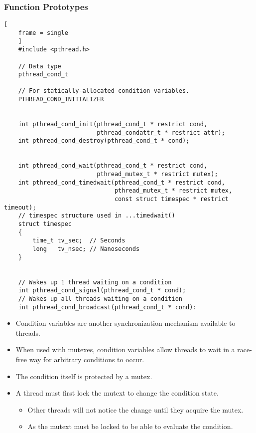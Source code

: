 \documentclass{article}
\begin{document}
\subsubsection{Function Prototypes}
\begin{lstlisting}[
    frame = single
    ]
    #include <pthread.h>

    // Data type
    pthread_cond_t

    // For statically-allocated condition variables.
    PTHREAD_COND_INITIALIZER


    int pthread_cond_init(pthread_cond_t * restrict cond,
                          pthread_condattr_t * restrict attr);
    int pthread_cond_destroy(pthread_cond_t * cond);


    int pthread_cond_wait(pthread_cond_t * restrict cond,
                          pthread_mutex_t * restrict mutex);
    int pthread_cond_timedwait(pthread_cond_t * restrict cond,
                               pthread_mutex_t * restrict mutex,
                               const struct timespec * restrict timeout);
    // timespec structure used in ...timedwait()
    struct timespec 
    {
        time_t tv_sec;  // Seconds
        long   tv_nsec; // Nanoseconds
    }


    // Wakes up 1 thread waiting on a condition
    int pthread_cond_signal(pthread_cond_t * cond);
    // Wakes up all threads waiting on a condition
    int pthread_cond_broadcast(pthread_cond_t * cond):
\end{lstlisting}
\begin{itemize}
    \item Condition variables are another synchronization mechanism available to threads.
    \item When used with mutexes, condition variables allow threads to wait in a race-free way for arbitrary conditions to occur.
    \item The condition itself is protected by a mutex.
    \item A thread must first lock the mutext to change the condition state.
    \begin{itemize}
        \item Other threads will not notice the change until they acquire the mutex.
    \end{itemize}
        \begin{itemize}
            \item As the mutext must be locked to be able to evaluate the condition.
        \end{itemize}
\end{itemize}
\end{document}

